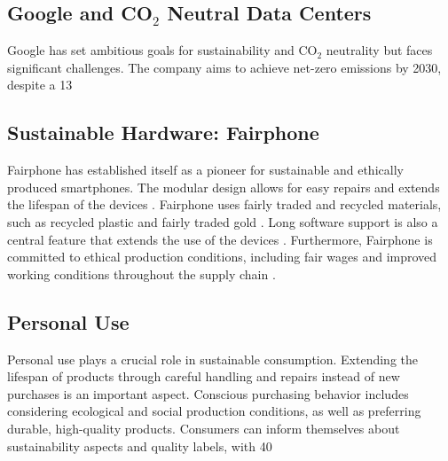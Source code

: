 \documentclass[10pt,twocolumn,conference]{IEEEtran}
\begin{document}
\subsection{Google and CO$_2$ Neutral Data Centers}
Google has set ambitious goals for sustainability and CO$_2$ neutrality but faces significant challenges. The company aims to achieve net-zero emissions by 2030, despite a 13%

\subsection{Sustainable Hardware: Fairphone}
Fairphone has established itself as a pioneer for sustainable and ethically produced smartphones. The modular design allows for easy repairs and extends the lifespan of the devices \cite{fairphoneimpact}. Fairphone uses fairly traded and recycled materials, such as recycled plastic and fairly traded gold \cite{fairphoneimpact}. Long software support is also a central feature that extends the use of the devices \cite{fairphoneimpact}. Furthermore, Fairphone is committed to ethical production conditions, including fair wages and improved working conditions throughout the supply chain \cite{fairphoneimpact}.

\subsection{Personal Use}
Personal use plays a crucial role in sustainable consumption. Extending the lifespan of products through careful handling and repairs instead of new purchases is an important aspect. Conscious purchasing behavior includes considering ecological and social production conditions, as well as preferring durable, high-quality products. Consumers can inform themselves about sustainability aspects and quality labels, with 40%
\end{document}
